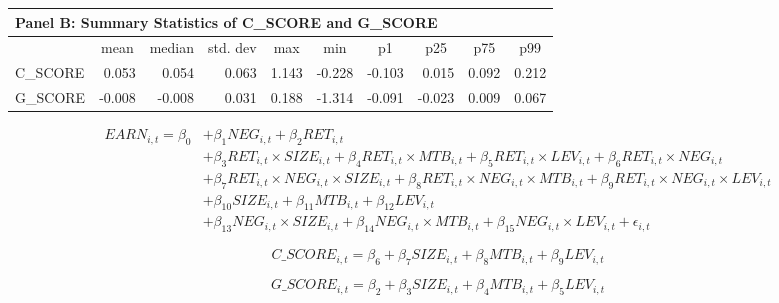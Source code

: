 \begin{table}[htbp]
	\begin{center}
		\begin{tabular}{lrrrrrrrrr}
			\multicolumn{10}{l}{\textbf{Panel B: Summary Statistics of C\_SCORE and G\_SCORE}}  \\
			\midrule
			\midrule
			& \multicolumn{1}{c}{mean} & \multicolumn{1}{c}{median} & \multicolumn{1}{c}{std. dev} & \multicolumn{1}{c}{max} & \multicolumn{1}{c}{min} & \multicolumn{1}{c}{p1} & \multicolumn{1}{c}{p25} & \multicolumn{1}{c}{p75} & \multicolumn{1}{c}{p99} \\
			\midrule
			C\_SCORE & 0.053 & 0.054 & 0.063 & 1.143 & -0.228 & -0.103 & 0.015 & 0.092 & 0.212 \\
			G\_SCORE & -0.008 & -0.008 & 0.031 & 0.188 & -1.314 & -0.091 & -0.023 & 0.009 & 0.067 \\
			\bottomrule
			\bottomrule
		\end{tabular}%
	\end{center}
		\begin{footnotesize}
			\setcounter{equation}{2}
			\begin{equation}
				\begin{split}
					EARN_{i,t} = \beta_0&+\beta_1NEG_{i,t}+\beta_2RET_{i,t}\\
					&+\beta_3RET_{i,t}\times SIZE_{i,t}+\beta_4RET_{i,t}\times MTB_{i,t}+\beta_5RET_{i,t}\times LEV_{i,t}+\beta_6RET_{i,t}\times NEG_{i,t}\\
					&+\beta_7RET_{i,t}\times NEG_{i,t}\times SIZE_{i,t}+\beta_8RET_{i,t}\times NEG_{i,t}\times MTB_{i,t}+\beta_9RET_{i,t}\times NEG_{i,t}\times 	LEV_{i,t}\\
					&+\beta_{10}SIZE_{i,t}+\beta_{11}MTB_{i,t}+\beta_{12}LEV_{i,t}\\
					&+\beta_{13}NEG_{i,t}\times SIZE_{i,t}+\beta_{14}NEG_{i,t}\times MTB_{i,t}+\beta_{15}NEG_{i,t}\times LEV_{i,t}+ \epsilon_{i,t}
				\end{split}
			\end{equation}
		
			\begin{equation}
				C\_SCORE_{i,t} = \beta_6+\beta_7SIZE_{i,t}+\beta_8MTB_{i,t}+\beta_9LEV_{i,t}
			\end{equation}
		
			\begin{equation}
				G\_SCORE_{i,t} = \beta_2+\beta_3SIZE_{i,t}+\beta_4MTB_{i,t}+\beta_5LEV_{i,t}
			\end{equation}
			

\end{footnotesize}
\end{table}
